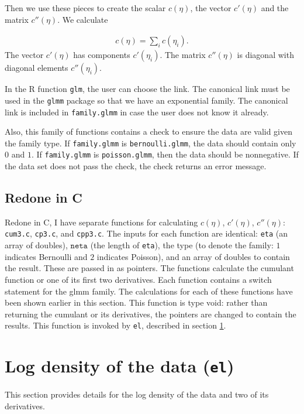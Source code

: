 \documentclass{article}
\begin{document}
Then we use these pieces to create the scalar $c(\eta)$, the vector $c'(\eta)$ and the matrix $c''(\eta)$. We calculate

\begin{align}
c(\eta)= \sum_i c(\eta_i).
\end{align}
 The vector $c'(\eta)$ has components $c'(\eta_i)$. The matrix $c''(\eta)$ is diagonal with diagonal elements $c''(\eta_i)$.

In the R function \texttt{glm}, the user can choose the link. The canonical link must be used in the \texttt{glmm} package so that we have an exponential family. The canonical link is included in \texttt{family.glmm}  in case the user does not know it already.

Also, this family of functions contains a check to ensure the data are valid given the family type. If \texttt{family.glmm} is \texttt{bernoulli.glmm}, the data should contain only $0$ and $1$. If \texttt{family.glmm} is \texttt{poisson.glmm}, then the data should be nonnegative.  If the data set does not pass the check, the check returns an error message. 

\subsection{Redone in C}
Redone in C, I  have  separate functions for calculating $c(\eta)$, $c'(\eta)$, $c''(\eta)$: \texttt{cum3.c}, \texttt{cp3.c}, and \texttt{cpp3.c}. The inputs for each function are identical:  \texttt{eta} (an array of doubles), $\texttt{neta}$ (the length of \texttt{eta}), the type (to denote the family: $1$ indicates Bernoulli and $2$ indicates Poisson), and an array of doubles to contain the result. These are passed in as pointers. The functions  calculate  the cumulant function or one of its first two derivatives. Each function  contains a switch statement for the glmm family. The calculations for each of these functions have  been shown earlier in this section. This function is type void: rather than returning the cumulant or its derivatives, the pointers are changed to contain the results. This function is invoked by \texttt{el}, described in section \ref{sec:el}.


\section{Log density of the data (\texttt{el})}\label{sec:el}
This section provides details for the log density of the data and two of its derivatives.  
\end{document}
